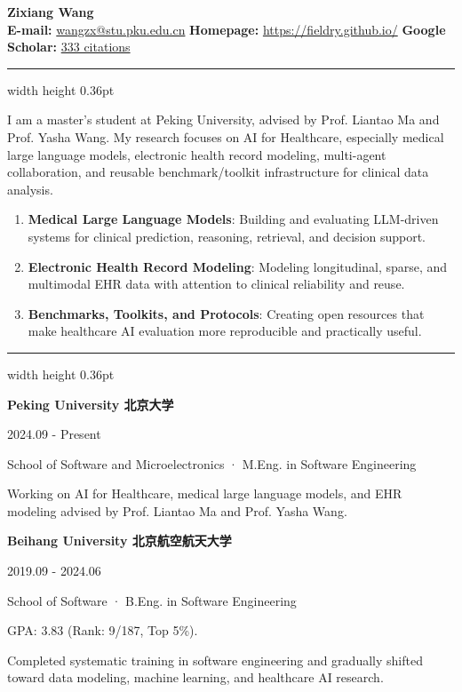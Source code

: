 \documentclass[10pt,a4paper]{article}
\newcommand{\sectiontitle}[1]{%
    \par\vspace{2.6mm}%
    \noindent{\Large\textbf{#1}}\par
    \vspace{0.9mm}%
    \hrule width \textwidth height 0.36pt
    \vspace{1.85mm}%
}
\newcommand{\entryhead}[2]{
    \noindent
    \begin{minipage}[t]{0.82\textwidth}
    \raggedright #1
    \end{minipage}
    \hfill
    \begin{minipage}[t]{0.16\textwidth}
    \raggedleft\footnotesize\textcolor{mutedgray}{#2}
    \end{minipage}
    \par
}
\newcommand{\educationentry}[4]{
    \entryhead{#1}{#2}
    {\small #3\par}
    #4
    \vspace{1mm}
}
\begin{document}
\begin{center}
{\huge\textbf{Zixiang Wang}}\\
\vspace{1.2mm}
\textbf{E-mail:} \href{mailto:wangzx@stu.pku.edu.cn}{wangzx@stu.pku.edu.cn}\hspace{5mm}
\textbf{Homepage:} \href{https://fieldry.github.io/}{https://fieldry.github.io/}\hspace{5mm}
\textbf{Google Scholar:} \href{https://scholar.google.com/citations?user=U73PSFAAAAAJ}{333 citations}
\end{center}
\vspace{-0.4mm}

\sectiontitle{Research Interest}
{\small I am a master's student at Peking University, advised by Prof. Liantao Ma and Prof. Yasha Wang. My research focuses on AI for Healthcare, especially medical large language models, electronic health record modeling, multi-agent collaboration, and reusable benchmark/toolkit infrastructure for clinical data analysis.\par}
\begin{enumerate}[label=(\arabic*)]
\item {\small\textbf{Medical Large Language Models}: Building and evaluating LLM-driven systems for clinical prediction, reasoning, retrieval, and decision support.}
\item {\small\textbf{Electronic Health Record Modeling}: Modeling longitudinal, sparse, and multimodal EHR data with attention to clinical reliability and reuse.}
\item {\small\textbf{Benchmarks, Toolkits, and Protocols}: Creating open resources that make healthcare AI evaluation more reproducible and practically useful.}
\end{enumerate}

\sectiontitle{Education}
\educationentry{\textbf{Peking University 北京大学}}{2024.09 - Present}{School of Software and Microelectronics · M.Eng. in Software Engineering}{    {\small Working on AI for Healthcare, medical large language models, and EHR modeling advised by Prof. Liantao Ma and Prof. Yasha Wang.\par}}
\educationentry{\textbf{Beihang University 北京航空航天大学}}{2019.09 - 2024.06}{School of Software · B.Eng. in Software Engineering}{    {\small GPA: 3.83 (Rank: 9/187, Top 5\%).\par}
    {\small Completed systematic training in software engineering and gradually shifted toward data modeling, machine learning, and healthcare AI research.\par}}
\end{document}
